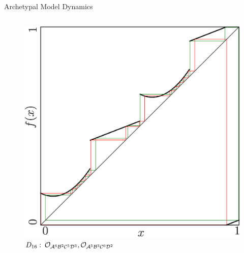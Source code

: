 \begin{frame}{Archetypal Model Dynamics}
{\begin{columns}
\begin{column}{.9 \textwidth}
\begin{figure}
{						\includegraphics[height=0.45\textheight]{../Figures/6/6.2d/result.png}
					}{$D_{16}:\:\mathcal{O}_{\mathcal{A}^6\mathcal{B}^2\mathcal{C}^5\mathcal{D}^3},\mathcal{O}_{\mathcal{A}^5\mathcal{B}^3\mathcal{C}^6\mathcal{D}^2}$}
\end{figure}
\end{column}
\end{columns}}
\end{frame}
